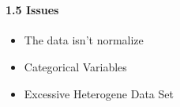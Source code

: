 \documentclass[11pt]{article}
\providecommand{\tightlist}{%
      \setlength{\itemsep}{0pt}\setlength{\parskip}{0pt}}
\begin{document}
    \begin{center}
    \end{center}
    { \hspace*{\fill} \\}
    
    \paragraph{1.5 Issues}\label{issues}

\begin{itemize}
\tightlist
\item
  The data isn't normalize
\item
  Categorical Variables
\item
  Excessive Heterogene Data Set
\end{itemize}


    
    
    
    
\end{document}

